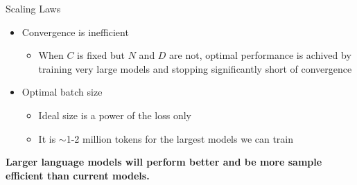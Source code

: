 \begin{vbframe}{Scaling Laws}

\vfill

\begin{itemize}

	\item Convergence is inefficient
	\begin{itemize}
	\item When $C$ is fixed but $N$ and $D$ are not, optimal performance is achived by training very large models and stopping significantly short of convergence  
	\end{itemize}

	\item Optimal batch size
	\begin{itemize}
	\item Ideal size is a power of the loss only
	\item It is $\sim$1-2 million tokens for the largest models we can train
	\end{itemize}

\end{itemize}

\vskip3mm

\textbf{Larger language models will perform better and be more sample efficient than current models.} 

\vfill

\end{vbframe}


